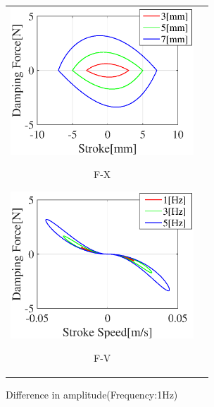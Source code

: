 \documentclass[a4paper,12pt]{article_vdlab_sotsuron}
\begin{document}
\vspace*{5mm}
\begin{figure}[h]
  \begin{tabular}{cc}
  \begin{minipage}{0.5\hsize}
  \begin{center}
    \includegraphics[height=55mm]{figure/damper_x_1_Fx.eps}
    \end{center}
    \begin{center}
    \ F-X\
    \end{center}
  \end{minipage}
  \begin{minipage}{0.5\hsize}
     \begin{center}
      \includegraphics[height=55mm]{figure/damper_x_1_Fv.eps}
      \end{center}
      \begin{center}
      \ F-V\
    \end{center}
  \end{minipage}
  \end{tabular}
  \vspace*{3mm}
  \caption{Difference in amplitude(Frequency:1Hz)}
    \label{fig:damper_x_3}
\end{figure}
\end{document}
